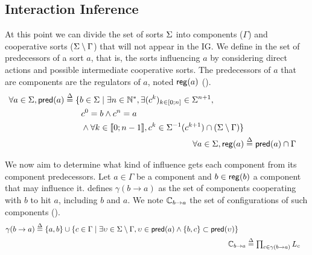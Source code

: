 \subsection{Interaction Inference}\label{ssec:infer-IG}

At this point we can divide the set of sorts $\Sigma$ into components ($\Gamma$) and cooperative sorts
($\Sigma \setminus \Gamma$) that will not appear in the IG. 
We define in  the set of predecessors of a sort $a$, that is, the sorts influencing $a$
by considering direct actions and possible intermediate cooperative sorts.
The predecessors of $a$ that are components are the regulators of $a$, noted $\mathsf{reg}({a})$
().
\begin{align}
\begin{split}
\forall a \in \Sigma, \mathsf{pred}(a) &\stackrel{\Delta}= \{b \in \Sigma \mid \exists n \in \mathbb{N}^*, \exists
(c^k)_{k \in [0;n]} \in \Sigma^{n+1}, \\
                                   & \quad \quad c^0 = b \wedge c^n = a \\
                                   & \quad \quad \wedge \forall k \in \llbracket 0 ; n-1 \rrbracket,
								   c^k \in \Sigma^{-1}(c^{k+1}) \cap (\Sigma\setminus\Gamma)\}
\end{split}
\label{eq:ph_predec}
\\
\forall a\in \Sigma, \mathsf{reg}({a}) & \stackrel{\Delta}= \mathsf{pred}(a) \cap \Gamma
\label{eq:regulators}
\end{align}

We now aim to determine what kind of influence gets each component from its component predecessors.
Let $a \in \Gamma$ be a component and $b \in \mathsf{reg}({b})$ a component that may influence it.
 defines 
$\gamma(b\rightarrow a)$ as the set of components cooperating with $b$ to hit $a$, including $b$ and
$a$.
We note $\mathbb C_{b\rightarrow a}$ the set of configurations of such components ().
\begin{align}
\begin{split}
\gamma(b\rightarrow a)  &\stackrel{\Delta}= \{ a, b \} \cup \{ c \in \Gamma \mid 
			\exists \upsilon\in\Sigma\setminus\Gamma,
				\upsilon\in\mathsf{pred}(a) \wedge \{b,c\}\subset\mathsf{pred}(\upsilon) \}
\end{split}
\label{eq:cooperating-with-b}
\\
\mathbb C_{b\rightarrow a} & \stackrel{\Delta}= \textstyle\prod_{c\in\gamma(b\rightarrow a)} L_c
\label{eq:configurations}
\end{align}

